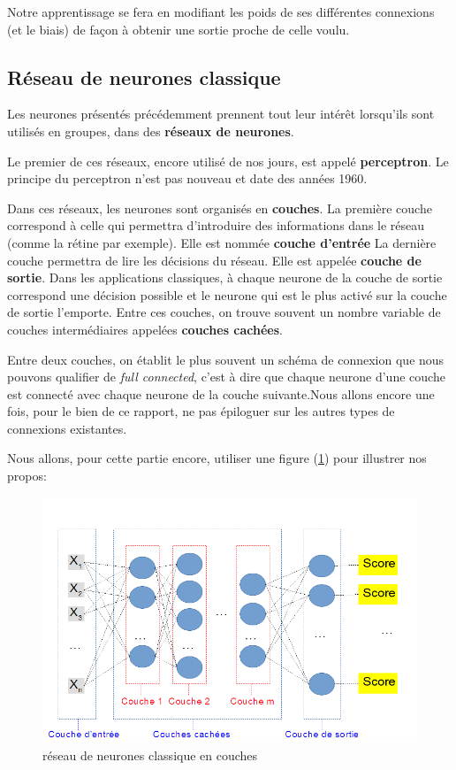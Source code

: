 Notre apprentissage se fera en modifiant les poids de ses différentes
connexions (et le biais) de façon à obtenir une sortie proche de celle voulu.\newline

\hypertarget{Ruxe9seau-de-neurones-classique}{%
\subsection{Réseau de neurones classique}
\label{Ruxe9seau-de-neurones-classique}}

Les neurones présentés précédemment prennent tout leur intérêt lorsqu'ils sont utilisés en groupes, dans des \textbf{réseaux de neurones}.

Le premier de ces réseaux, encore utilisé de nos jours, est appelé \textbf{perceptron}.
Le principe du perceptron n'est pas nouveau et date des années 1960.

Dans ces réseaux, les neurones sont organisés en \textbf{couches}.
La première couche correspond à celle qui permettra d'introduire des informations dans le réseau (comme la rétine par exemple). Elle est nommée \textbf{couche d'entrée}
La dernière couche permettra de lire les décisions du réseau. Elle est appelée \textbf{couche de sortie}. Dans les applications classiques, à chaque neurone de la couche de sortie correspond une décision possible et le neurone qui est le plus activé sur la couche de sortie l'emporte.
Entre ces couches, on trouve souvent un nombre variable de couches intermédiaires appelées \textbf{couches cachées}.

Entre deux couches, on établit le plus souvent un schéma de connexion que nous pouvons qualifier de \textit{full connected}, c'est à dire que chaque neurone d'une couche est connecté avec chaque neurone de la couche suivante.Nous allons encore une fois, pour le bien de ce rapport, ne pas épiloguer sur les autres types de connexions existantes.\newline

Nous allons, pour cette partie encore, utiliser une figure (\ref{reseauClassique}) pour illustrer nos propos:

\begin{figure}[h]
\includegraphics[width=16.5cm]{./images/multicouche.png}
\caption{réseau de neurones classique en couches}
\label{reseauClassique}
\end{figure}



